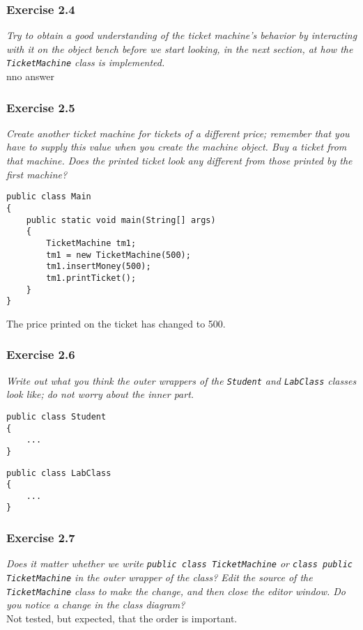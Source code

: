 \subsubsection*{Exercise 2.4}
\textit{Try to obtain a good understanding of the ticket machine's behavior by 
interacting with it on the object bench before we start looking, in the next 
section, at how the \lstinline{TicketMachine} class is implemented. }\\
nno answer

\subsubsection*{Exercise 2.5}
\textit{Create another ticket machine for tickets of a different price; 
remember that you have to supply this value when you create the machine object. 
Buy a ticket from that machine. Does the printed ticket look any different 
from those printed by the first machine? }\\
\begin{lstlisting}[caption=Solution for Exercise 2.5 in Eclipse]
public class Main
{
	public static void main(String[] args)
	{
		TicketMachine tm1;
		tm1 = new TicketMachine(500);
		tm1.insertMoney(500);
		tm1.printTicket();
	}
}
\end{lstlisting}
The price printed on the ticket has changed to 500. 

\subsubsection*{Exercise 2.6}
\textit{Write out what you think the outer wrappers of the \lstinline{Student} and 
\lstinline{LabClass} classes look like; do not worry about the inner part. }\\
\begin{lstlisting}[caption=Solution for Exercise 2.6 wrapper of Student class]
public class Student
{
	...
}
\end{lstlisting}
\begin{lstlisting}[caption=Solution for Exercise 2.6 wrapper of LabClass class]
public class LabClass
{
	...
}
\end{lstlisting}


\subsubsection*{Exercise 2.7}
\textit{Does it matter whether we write \lstinline{public class TicketMachine} or 
\lstinline{class public TicketMachine} in the outer wrapper of the class? Edit the 
source of the \lstinline{TicketMachine} class to make the change, and then close 
the editor window. Do you notice a change in the class diagram? }\\
Not tested, but expected, that the order is important. 

